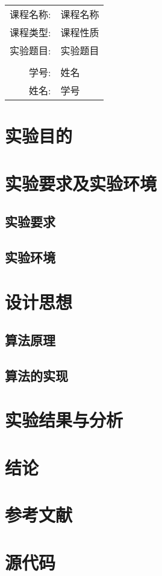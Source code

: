 \documentclass[UTF8]{ctexart}
\newcommand\info[5]{
\begin{center} \Large
	\begin{tabular}{rl}
		课程名称: & #1 \\
		课程类型: & #2 \\
		实验题目: & #3 \\
		\quad \\
		学号: & #4 \\
		姓名: & #5 \\
	\end{tabular}
\end{center}}
\begin{document}
\maketitle
\info{课程名称}{课程性质}{实验题目}{姓名}{学号}
\newpage

\tableofcontents
\newpage

\section{实验目的}
                                               
\section{实验要求及实验环境}

\subsection{实验要求}

\subsection{实验环境}


\section{设计思想}

\subsection{算法原理}

\subsection{算法的实现}

\section{实验结果与分析}


\section{结论}


\section{参考文献}
%
\appendix

\section{源代码}
\end{document}
